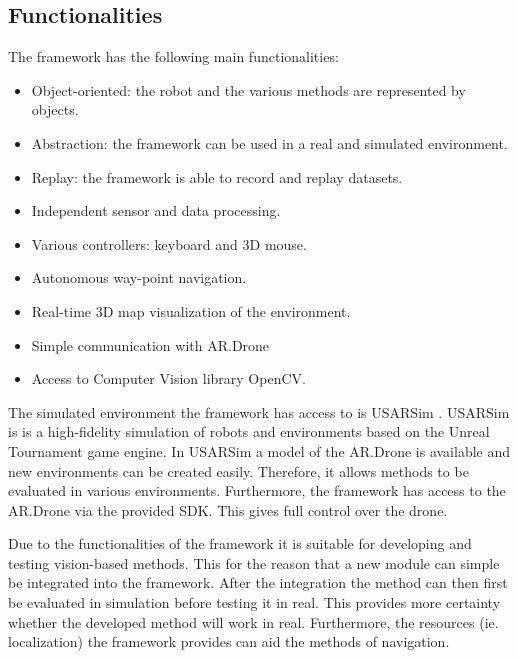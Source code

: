\documentclass[a4paper]{article}
\begin{document}
\begin{appendices}
\subsection{Functionalities}
The framework has the following main functionalities:
\begin{itemize}
\item Object-oriented: the robot and the various methods are represented by objects.
\item Abstraction: the framework can be used in a real and simulated environment.
\item Replay: the framework is able to record and replay datasets.
\item Independent sensor and data processing.
\item Various controllers: keyboard and 3D mouse.
\item Autonomous way-point navigation.
\item Real-time 3D map visualization of the environment.
\item Simple communication with AR.Drone
\item Access to Computer Vision library OpenCV.
\end{itemize}
The simulated environment the framework has access to is  USARSim \cite{Visser2011}. USARSim is is a high-fidelity simulation of robots and environments based on the Unreal Tournament game engine. In USARSim a model of the AR.Drone is available and new environments can be created easily. Therefore, it allows methods to be evaluated in various environments. Furthermore, the framework has access to the AR.Drone via the provided SDK. This gives full control over the drone.

Due to the functionalities of the framework it is suitable for developing and testing vision-based methods. This for the reason that a new module can simple be integrated into the framework. After the integration the method can then first be evaluated in simulation before testing it in real. This provides more certainty whether the developed method will work in real. Furthermore, the resources (ie. localization) the framework provides can aid the methods of navigation.


\end{appendices}
\end{document}
